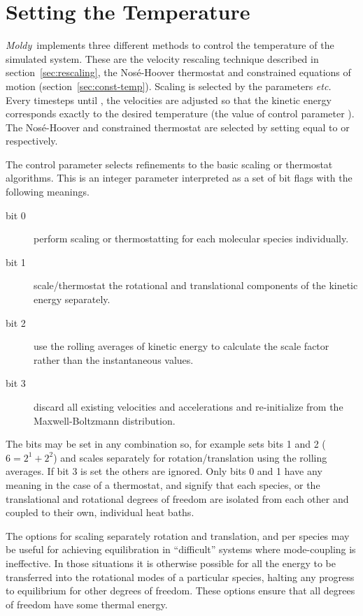 \documentclass[a4paper,twoside]{report}
\newcommand{\moldy}{\emph{Moldy}}
\newcommand{\etc}{\emph{etc.}}
\begin{document}
\section{Setting the Temperature}%

\moldy\ implements three different methods to control the temperature
of the simulated system. These are the velocity rescaling technique
described in section~\ref{sec:rescaling}, the Nos{\'e}-Hoover thermostat
and constrained equations of motion (section~\ref{sec:const-temp}).
Scaling is selected by the parameters  \etc\ %
Every  timesteps until , the
velocities are adjusted so that the kinetic energy corresponds exactly
to the desired temperature (the value of control parameter
).  The Nos{\'e}-Hoover and constrained thermostat
are selected by setting  equal to  or
 respectively.

The control parameter  selects refinements to
the basic scaling or thermostat algorithms. This is an integer
parameter interpreted as a set of bit flags with the following meanings.
\begin{description}
\item[bit 0]    perform scaling or thermostatting for each molecular species individually.
\item[bit 1]    scale/thermostat the rotational and translational components of
the kinetic energy separately.
\item[bit 2]    use the rolling averages of kinetic energy to
calculate the scale factor rather than the instantaneous values.
\item[bit 3]    discard all existing velocities and accelerations and
re-initialize from the Maxwell-Boltzmann distribution.
\end{description}
The bits may be set in any combination so, for example
 sets bits 1 and 2 ($ 6 = 2^1 + 2^2$) and scales
separately for rotation/translation using the rolling averages.  If
bit 3 is set the others are ignored.  Only bits 0 and 1 have any
meaning in the case of a thermostat, and signify that each species, or
the translational and rotational degrees of freedom are isolated from
each other and coupled to their own, individual heat baths.

The options for scaling separately rotation and translation, and per
species may be useful for achieving equilibration in ``difficult''
systems where mode-coupling is ineffective.  In those situations it is
otherwise possible for all the energy to be transferred into the
rotational modes of a particular species, halting any progress to
equilibrium for other degrees of freedom.   These options ensure that
all degrees of freedom have some thermal energy.
\end{document}
